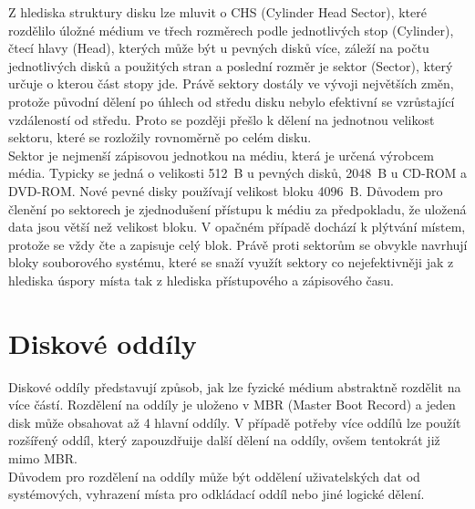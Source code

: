 Z hlediska struktury disku lze mluvit o CHS (Cylinder Head Sector), které rozdělilo úložné médium ve třech rozměrech podle jednotlivých stop (Cylinder), čtecí hlavy (Head), kterých může být u pevných disků více, záleží na počtu jednotlivých disků a použitých stran a poslední rozměr je sektor (Sector), který určuje o kterou část stopy jde. Právě sektory dostály ve vývoji největších změn, protože původní dělení po úhlech od středu disku nebylo efektivní se vzrůstající vzdáleností od středu. Proto se později přešlo k dělení na jednotnou velikost sektoru, které se rozložily rovnoměrně po celém disku.\\
Sektor je nejmenší zápisovou jednotkou na médiu, která je určená výrobcem média. Typicky se jedná o velikosti 512~B u pevných disků, 2048~B u CD-ROM a DVD-ROM. Nové pevné disky používají velikost bloku 4096~B. Důvodem pro členění po sektorech je zjednodušení přístupu k médiu za předpokladu, že uložená data jsou větší než velikost bloku. V opačném případě dochází k plýtvání místem, protože se vždy čte a zapisuje celý blok. Právě proti sektorům se obvykle navrhují bloky souborového systému, které se snaží využít sektory co nejefektivněji jak z hlediska úspory místa tak z hlediska přístupového a zápisového času.

\section{Diskové oddíly}
Diskové oddíly představují způsob, jak lze fyzické médium abstraktně rozdělit na více částí. Rozdělení na oddíly je uloženo v MBR (Master Boot Record) a jeden disk může obsahovat až 4 hlavní oddíly. V případě potřeby více oddílů lze použít rozšířený oddíl, který zapouzdřuije další dělení na oddíly, ovšem tentokrát již mimo MBR.\\
Důvodem pro rozdělení na oddíly může být oddělení uživatelských dat od systémových, vyhrazení místa pro odkládací oddíl nebo jiné logické dělení. 


